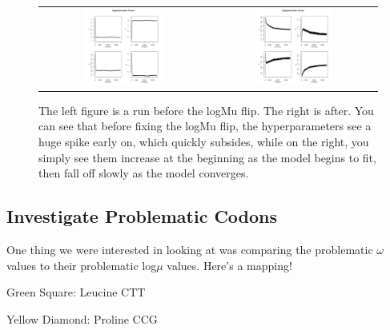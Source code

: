 \begin{figure}[h!]
\caption{The left figure is a run before the logMu flip. The right is after. You can see that before fixing the logMu flip, the hyperparameters see a huge spike early on, which quickly subsides, while on the right, you simply see them increase at the beginning as the model begins to fit, then fall off slowly as the model converges.}
\begin{tabular}{c|c}
\includegraphics[width=0.48\textwidth]{data/11-24-hyperparameters-6000-4a2-noMflip.png}
&
\includegraphics[width=0.48\textwidth]{data/11-21-hyperparameters-6000-1a2-Mflip.png}
\end{tabular}


\end{figure}


\subsection{Investigate Problematic Codons}

One thing we were interested in looking at was comparing the problematic $\omega$ values to their problematic log$\mu$ values. Here's a mapping!

Green Square: Leucine CTT

Yellow Diamond: Proline CCG

